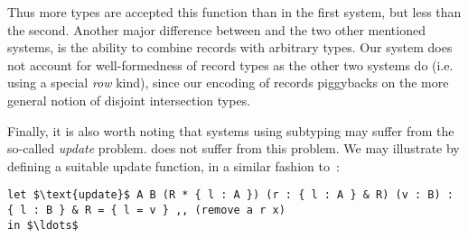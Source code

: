 Thus more types are accepted this function than in the first system, but less than the second. 
Another major difference between \name and the two other mentioned systems, is the ability to 
combine records with arbitrary types.
Our system does not account for well-formedness of record types as the other two systems do 
(i.e. using a special \emph{row} kind), since our encoding of records piggybacks on the more
general notion of disjoint intersection types. 

Finally, it is also worth noting that systems using subtyping may suffer from the so-called 
\emph{update} problem.
\name does not suffer from this problem. 
We may illustrate by defining a suitable update function, in a similar fashion 
to~\cite{leijen2005extensible}:
\begin{lstlisting}[mathescape=true]
let $\text{update}$ A B (R * { l : A }) (r : { l : A } & R) (v : B) : { l : B } & R = { l = v } ,, (remove a r x) 
in $\ldots$ 
\end{lstlisting}



